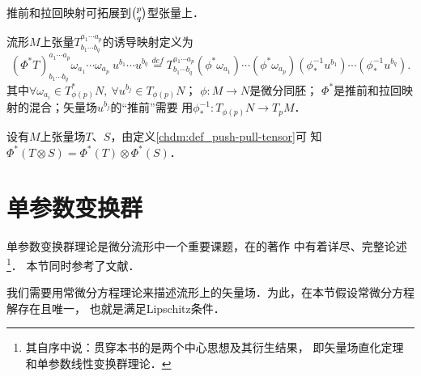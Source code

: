 推前和拉回映射可拓展到$\binom{p}{q}$型张量上．
\begin{definition}\label{chdm:def_push-pull-tensor}
    流形$M$上张量$T_{b_1\cdots b_q}^{a_1\cdots a_p}$的诱导映射定义为
    \begin{equation*}
        (\Phi^{*}T)_{b_1\cdots b_q}^{a_1\cdots a_p} \omega_{a_1}\cdots \omega_{a_p}\  u^{b_1} \cdots u^{b_q}
        \overset{def}{=} T_{b_1\cdots b_q}^{a_1\cdots a_p}
        (\phi^{*}\omega_{a_1})\cdots (\phi^{*}\omega_{a_p})
        (\phi_{*}^{-1}u^{b_1})\cdots (\phi_{*}^{-1}u^{b_q}) .
    \end{equation*}
    其中$\forall \omega_{a_i} \in T^{*}_{\phi(p)}N,\ \forall u^{b_j} \in T_{\phi(p)}N$；
    $\phi:M\to N$是微分同胚；
    $\Phi^{*}$是推前和拉回映射的混合；矢量场$u^{b_j}$的“推前”需要
    用$\phi_{*}^{-1}:T_{\phi(p)}N\to T_p M$．
\end{definition}

\begin{proposition}\label{chdm:thm_pptt}
    设有$M$上张量场$T$、$S$，由定义\ref{chdm:def_push-pull-tensor}可
    知$\Phi^{*}(T\otimes S) = \Phi^{*}(T) \otimes \Phi^{*}(S)$．
\end{proposition}

%
%
%
%


\section{单参数变换群}\label{chdm:sec_One-Parameter-Transformations-Groups}
单参数变换群理论是微分流形中一个重要课题，在\textcite{arnold-2001-ode}的著作
中有着详尽、完整论述{\footnote{其自序中说：贯穿本书的是两个中心思想及其衍生结果，
即矢量场直化定理和单参数线性变换群理论．}}．
本节同时参考了文献\parencite[\S 6.2]{cc2001-zh}．

我们需要用常微分方程理论来描述流形上的矢量场．为此，在本节假设常微分方程解存在且唯一，
也就是满足Lipschitz条件\cite[\S 31]{arnold-2001-ode}．

